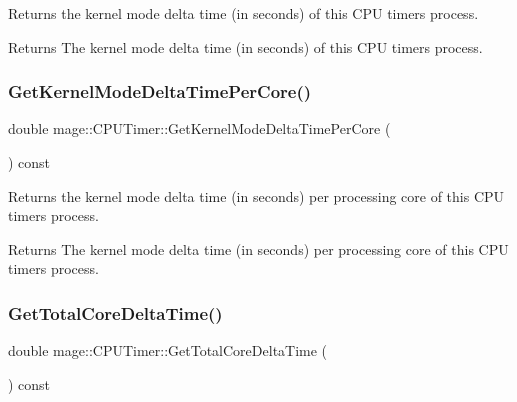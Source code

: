 Returns the kernel mode delta time (in seconds) of this C\+PU timer\textquotesingle{}s process.

\begin{DoxyReturn}{Returns}
The kernel mode delta time (in seconds) of this C\+PU timer\textquotesingle{}s process. 
\end{DoxyReturn}
\hypertarget{classmage_1_1_c_p_u_timer_ae69c9126851135ec5d0eda930ace3999}{}\label{classmage_1_1_c_p_u_timer_ae69c9126851135ec5d0eda930ace3999} 
\subsubsection{\texorpdfstring{Get\+Kernel\+Mode\+Delta\+Time\+Per\+Core()}{GetKernelModeDeltaTimePerCore()}}
{\footnotesize\ttfamily double mage\+::\+C\+P\+U\+Timer\+::\+Get\+Kernel\+Mode\+Delta\+Time\+Per\+Core (\begin{DoxyParamCaption}{ }\end{DoxyParamCaption}) const}

Returns the kernel mode delta time (in seconds) per processing core of this C\+PU timer\textquotesingle{}s process.

\begin{DoxyReturn}{Returns}
The kernel mode delta time (in seconds) per processing core of this C\+PU timer\textquotesingle{}s process. 
\end{DoxyReturn}
\hypertarget{classmage_1_1_c_p_u_timer_a5fb59355f6c747be98bfb4d924a0a0ec}{}\label{classmage_1_1_c_p_u_timer_a5fb59355f6c747be98bfb4d924a0a0ec} 
\subsubsection{\texorpdfstring{Get\+Total\+Core\+Delta\+Time()}{GetTotalCoreDeltaTime()}}
{\footnotesize\ttfamily double mage\+::\+C\+P\+U\+Timer\+::\+Get\+Total\+Core\+Delta\+Time (\begin{DoxyParamCaption}{ }\end{DoxyParamCaption}) const}

